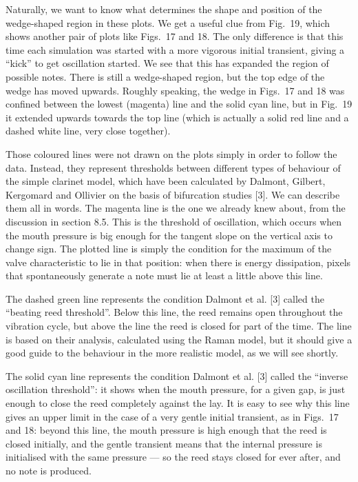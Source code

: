   Naturally, we want to know what determines the shape and position of the 
  wedge-shaped region in these plots. We get a useful clue from Fig.\ 19, which 
  shows another pair of plots like Figs.\ 17 and 18. The only difference is 
  that this time each simulation was started with a more vigorous initial 
  transient, giving a “kick” to get oscillation started. We see that this has 
  expanded the region of possible notes. There is still a wedge-shaped region, 
  but the top edge of the wedge has moved upwards. Roughly speaking, the wedge 
  in Figs.\ 17 and 18 was confined between the lowest (magenta) line and the 
  solid cyan line, but in Fig.\ 19 it extended upwards towards the top line 
  (which is actually a solid red line and a dashed white line, very close 
  together). 

  Those coloured lines were not drawn on the plots simply in order to follow 
  the data. Instead, they represent thresholds between different types of 
  behaviour of the simple clarinet model, which have been calculated by 
  Dalmont, Gilbert, Kergomard and Ollivier on the basis of bifurcation studies 
  [3]. We can describe them all in words. The magenta line is the one we 
  already knew about, from the discussion in section 8.5. This is the threshold 
  of oscillation, which occurs when the mouth pressure is big enough for the 
  tangent slope on the vertical axis to change sign. The plotted line is simply 
  the condition for the maximum of the valve characteristic to lie in that 
  position: when there is energy dissipation, pixels that spontaneously 
  generate a note must lie at least a little above this line. 

  The dashed green line represents the condition Dalmont et al. [3] called the 
  “beating reed threshold”. Below this line, the reed remains open throughout 
  the vibration cycle, but above the line the reed is closed for part of the 
  time. The line is based on their analysis, calculated using the Raman model, 
  but it should give a good guide to the behaviour in the more realistic model, 
  as we will see shortly. 

  The solid cyan line represents the condition Dalmont et al. [3] called the 
  “inverse oscillation threshold”: it shows when the mouth pressure, for a 
  given gap, is just enough to close the reed completely against the lay. It is 
  easy to see why this line gives an upper limit in the case of a very gentle 
  initial transient, as in Figs.\ 17 and 18: beyond this line, the mouth 
  pressure is high enough that the reed is closed initially, and the gentle 
  transient means that the internal pressure is initialised with the same 
  pressure — so the reed stays closed for ever after, and no note is produced. 

